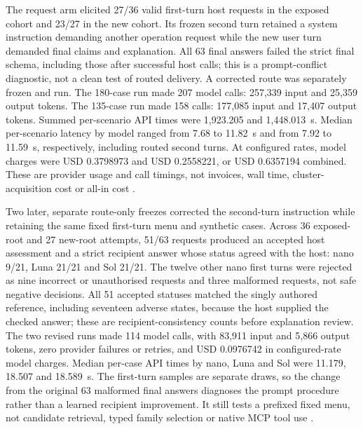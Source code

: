 \documentclass[preprint,12pt]{elsarticle}
\begin{document}
The request arm elicited 27/36 valid first-turn host requests in the exposed cohort and 23/27 in the new cohort. Its frozen second turn retained a system instruction demanding another operation request while the new user turn demanded final claims and explanation. All 63 final answers failed the strict final schema, including those after successful host calls; this is a prompt-conflict diagnostic, not a clean test of routed delivery. A corrected route was separately frozen and run. The 180-case run made 207 model calls: 257,339 input and 25,359 output tokens. The 135-case run made 158 calls: 177,085 input and 17,407 output tokens. Summed per-scenario API times were 1,923.205 and 1,448.013~s. Median per-scenario latency by model ranged from 7.68 to 11.82~s and from 7.92 to 11.59~s, respectively, including routed second turns. At configured rates, model charges were USD 0.3798973 and USD 0.2558221, or USD 0.6357194 combined. These are provider usage and call timings, not invoices, wall time, cluster-acquisition cost or all-in cost \citep{earlCampaignLive}.

Two later, separate route-only freezes corrected the second-turn instruction while retaining the same fixed first-turn menu and synthetic cases. Across 36 exposed-root and 27 new-root attempts, 51/63 requests produced an accepted host assessment and a strict recipient answer whose status agreed with the host: nano 9/21, Luna 21/21 and Sol 21/21. The twelve other nano first turns were rejected as nine incorrect or unauthorised requests and three malformed requests, not safe negative decisions. All 51 accepted statuses matched the singly authored reference, including seventeen adverse states, because the host supplied the checked answer; these are recipient-consistency counts before explanation review. The two revised runs made 114 model calls, with 83,911 input and 5,866 output tokens, zero provider failures or retries, and USD 0.0976742 in configured-rate model charges. Median per-case API times by nano, Luna and Sol were 11.179, 18.507 and 18.589~s. The first-turn samples are separate draws, so the change from the original 63 malformed final answers diagnoses the prompt procedure rather than a learned recipient improvement. It still tests a prefixed fixed menu, not candidate retrieval, typed family selection or native MCP tool use \citep{earlRouteV2}.
\end{document}
